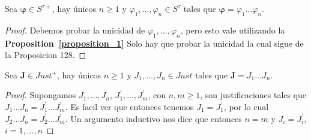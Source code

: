   \begin{lemma}
    \PN Sea $\pmb{\varphi} \in S^{\tau +}$, hay únicos $n \geq 1$ y $\varphi_{1}, \dotsc, \varphi_{n} \in S^{\tau}$
    tales que $\pmb{\varphi} = \varphi_{1} \dotsc \varphi_{n}$.
  \end{lemma}
  \begin{proof}
    \PN Debemos probar la unicidad de $\varphi_{1}, \dotsc, \varphi_{n}$, pero esto vale utilizando la
    \textbf{Proposition~\ref{proposition_1}} Solo hay que probar la unicidad la cual sigue de la Proposicion 128.
  \end{proof}

  \begin{lemma}
    \PN Sea $\mathbf{J} \in Just^{+}$, hay únicos $n \geq 1$ y $J_{1}, \dotsc, J_{n} \in Just$ tales que $\mathbf{J} =
    J_{1} \dotsc J_{n}$.
  \end{lemma}
  \begin{proof}
    \PN Supongamos $J_{1}, \dotsc, J_{n}$, $J_{1}^{\prime}, \dotsc, J_{m}^{\prime}$, con $ n,m\geq 1$, son
    justificaciones tales que $J_{1}\dotsc J_{n}=J_{1}^{\prime}\dotsc J_{m}^{\prime}$. Es facil ver que entonces tenemos
    $J_{1}=J_{1}^{\prime}$, por lo cual $J_{2}\dotsc J_{n}=J_{2}^{\prime}\dotsc J_{m}^{\prime}$. Un argumento inductivo
    nos dice que entonces $n=m$ y $J_{i}=J_{i}^{\prime}$, $ i=1, \dotsc, n$
  \end{proof}

